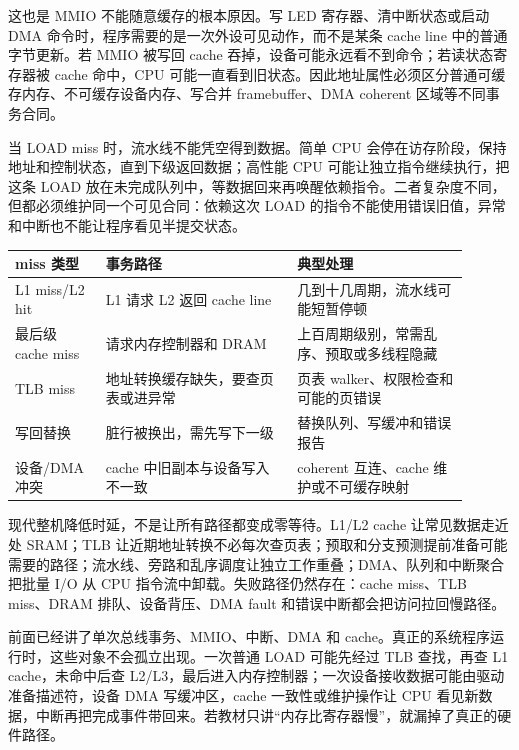 这也是 MMIO 不能随意缓存的根本原因。写 LED 寄存器、清中断状态或启动 DMA 命令时，程序需要的是一次外设可见动作，而不是某条 cache line 中的普通字节更新。若 MMIO 被写回 cache 吞掉，设备可能永远看不到命令；若读状态寄存器被 cache 命中，CPU 可能一直看到旧状态。因此地址属性必须区分普通可缓存内存、不可缓存设备内存、写合并 framebuffer、DMA coherent 区域等不同事务合同。

当 LOAD miss 时，流水线不能凭空得到数据。简单 CPU 会停在访存阶段，保持地址和控制状态，直到下级返回数据；高性能 CPU 可能让独立指令继续执行，把这条 LOAD 放在未完成队列中，等数据回来再唤醒依赖指令。二者复杂度不同，但都必须维护同一个可见合同：依赖这次 LOAD 的指令不能使用错误旧值，异常和中断也不能让程序看见半提交状态。

\begin{longtable}{L{0.18\linewidth}L{0.38\linewidth}L{0.34\linewidth}}
\toprule
miss 类型 & 事务路径 & 典型处理 \\
\midrule
L1 miss/L2 hit & L1 请求 L2 返回 cache line & 几到十几周期，流水线可能短暂停顿 \\
最后级 cache miss & 请求内存控制器和 DRAM & 上百周期级别，常需乱序、预取或多线程隐藏 \\
TLB miss & 地址转换缓存缺失，要查页表或进异常 & 页表 walker、权限检查和可能的页错误 \\
写回替换 & 脏行被换出，需先写下一级 & 替换队列、写缓冲和错误报告 \\
设备/DMA 冲突 & cache 中旧副本与设备写入不一致 & coherent 互连、cache 维护或不可缓存映射 \\
\bottomrule
\end{longtable}

现代整机降低时延，不是让所有路径都变成零等待。L1/L2 cache 让常见数据走近处 SRAM；TLB 让近期地址转换不必每次查页表；预取和分支预测提前准备可能需要的路径；流水线、旁路和乱序调度让独立工作重叠；DMA、队列和中断聚合把批量 I/O 从 CPU 指令流中卸载。失败路径仍然存在：cache miss、TLB miss、DRAM 排队、设备背压、DMA fault 和错误中断都会把访问拉回慢路径。


前面已经讲了单次总线事务、MMIO、中断、DMA 和 cache。真正的系统程序运行时，这些对象不会孤立出现。一次普通 LOAD 可能先经过 TLB 查找，再查 L1 cache，未命中后查 L2/L3，最后进入内存控制器；一次设备接收数据可能由驱动准备描述符，设备 DMA 写缓冲区，cache 一致性或维护操作让 CPU 看见新数据，中断再把完成事件带回来。若教材只讲“内存比寄存器慢”，就漏掉了真正的硬件路径。

